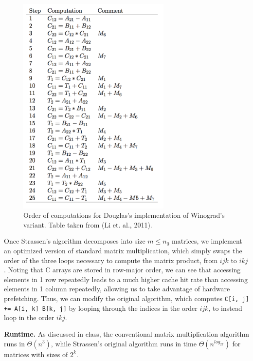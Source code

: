 \documentclass[a4paper]{article}
\begin{document}
\begin{figure}[h]
	\caption{Order of computations for Douglas's implementation of Winograd's variant. Table taken from (Li et. al., 2011).}
	\centering
		\includegraphics[width=3in]{computations.png}
\end{figure}

Once Strassen's algorithm decomposes into size $m\leq n_0$ matrices, we implement an optimized version of standard matrix multiplication, which simply swaps the order of the three loops necessary to compute the matrix product, from $ijk$ to $ikj$. Noting that C arrays are stored in row-major order, we can see that accessing elements in 1 row repeatedly leads to a much higher cache hit rate than accessing elements in 1 column repeatedly, allowing us to take advantage of hardware prefetching. Thus, we can modify the original algorithm, which computes \texttt{C[i, j] += A[i, k] B[k, j]} by looping through the indices in the order $ijk$, to instead loop in the order $ikj$.

\textbf{Runtime.} As discussed in class, the conventional matrix multiplication algorithm runs in $\Theta(n^3)$, while Strassen's original algorithm runs in time $\Theta(n^{log_27})$ for matrices with sizes of $2^k$.
\end{document}

